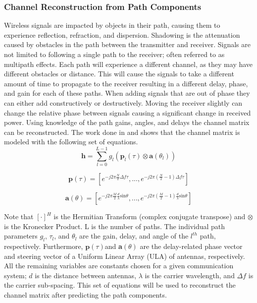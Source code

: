 \subsubsection{Channel Reconstruction from Path Components} \label{sssec:chrec}

Wireless signals are impacted by objects in their path, causing them to experience reflection, refraction, and dispersion. Shadowing is the attenuation caused by obstacles in the path between the transmitter and receiver. Signals are not limited to following a single path to the receiver; often referred to as multipath effects. Each path will experience a different channel, as they may have different obstacles or distance. This will cause the signals to take a different amount of time to propagate to the receiver resulting in a different delay, phase, and gain for each of these paths. When adding signals that are out of phase they can either add constructively or destructively. Moving the receiver slightly can change the relative phase between signals causing a significant change in received power. Using knowledge of the path gains, angles, and delays the channel matrix can be reconstructed. The work done in \cite{Li2020} and \cite{Han2019} shows that the channel matrix is modeled with the following set of equations.
\[
    \textbf{h} = \sum_{l=0}^{L-1} g_{l} ( \textbf{p}_{l} (\tau) \otimes \textbf{a}(\theta_{l}) )
\]

\[
    \textbf{p}(\tau) = [e^{-j 2 \pi \frac{N}{2} \Delta f \tau}, ..., e^{-j 2 \pi (\frac{N}{2} - 1) \Delta f \tau}]
\]

\[
    \textbf{a}(\theta) = [e^{-j 2 \pi \frac{M}{2} \frac{d}{\lambda} \mathrm{sin}\theta}, ..., e^{-j 2 \pi (\frac{M}{2} - 1) \frac{d}{\lambda} \mathrm{sin}\theta}]
\]

\noindent
Note that \([\cdot]^{H}\) is the Hermitian Transform (complex conjugate transpose) and \(\otimes\) is the Kronecker Product. L is the number of paths. The individual path parameters \(g_l\), \(\tau_l\), and \(\theta_l\) are the gain, delay, and angle of the \(l^{th}\) path, respectively. Furthermore, \(\textbf{p}(\tau)\)and \textbf{a}\((\theta)\) are the delay-related phase vector and steering vector of a Uniform Linear Array (ULA) of antennas, respectively. All the remaining variables are constants chosen for a given communication system; \(d\) is the distance between antennas, \(\lambda\) is the carrier wavelength, and \(\Delta f\) is the carrier sub-spacing. This set of equations will be used to reconstruct the channel matrix after predicting the path components.

